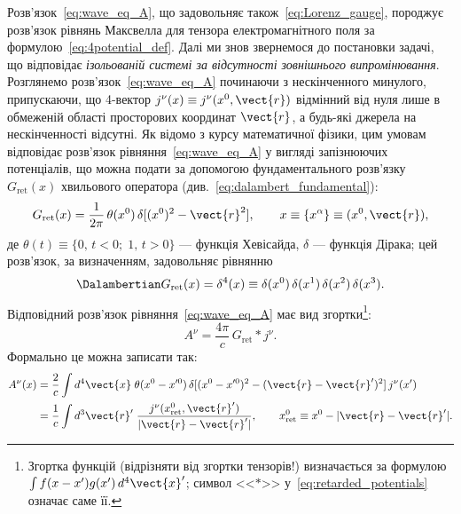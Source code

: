Розв'язок~\eqref{eq:wave_eq_A}, що задовольняє також~\eqref{eq:Lorenz_gauge}, породжує розв'язок рівнянь Максвелла для
тензора електромагнітного поля за формулою~\eqref{eq:4potential_def}. Далі ми знов звернемося до постановки задачі, що
відповідає \emph{ізольованій системі за відсутності зовнішнього випромінювання}. Розглянемо
розв'язок~\eqref{eq:wave_eq_A} починаючи з нескінченного минулого, припускаючи, що 4-вектор $j^{\nu}(x)\equiv
    j^{\nu}(x^0,\vect{r})$ відмінний від нуля лише в обмеженій області просторових координат $\vect{r}$, а будь-які джерела
на нескінченності відсутні. Як відомо з курсу математичної фізики, цим умовам відповідає розв'язок
рівняння~\eqref{eq:wave_eq_A} у вигляді запізнюючих потенціалів, що можна подати за допомогою фундаментального розв'язку
$G_\text{ret}(x)$ хвильового оператора (див.~\ref{eq:dalambert_fundamental}):
\begin{equation*}
    G_{\text{ret}}(x) = \frac{1}{2\pi}\,\theta(x^0)\,\delta[(x^0)^2 - \vect{r}^2],
    \qquad x\equiv\{x^{\alpha}\}\equiv(x^0,\vect{r}),
\end{equation*}
де $\theta(t)\equiv\{0,\,t<0;\;1,\,t>0\}$ --- функція Хевісайда, $\delta$ --- функція Дірака; цей розв'язок, за
визначенням, задовольняє рівнянню
\begin{equation*}
    \Dalambertian G_{\text{ret}}(x) = \delta^4(x)
    \equiv \delta(x^0)\,\delta(x^1)\,\delta(x^2)\,\delta(x^3).
\end{equation*}
Відповідний розв'язок рівняння~\eqref{eq:wave_eq_A} має вид згортки\footnote{Згортка функцій (відрізняти від згортки
    тензорів!) визначається за формулою $\int f(x-x')g(x')\,d^4\vect{x}'$; символ <<$*$>> у~\eqref{eq:retarded_potentials}
    означає саме її.}:
\begin{equation}\label{eq:retarded_potentials}
    A^{\nu} = \frac{4\pi}{c}\,G_{\text{ret}}*j^{\nu}.
\end{equation}
Формально це можна записати так:
\begin{align*}
    A^{\nu}(x) & = \frac{2}{c}\int d^4\vect{x}\;
    \theta(x^0-x'^0)\,\delta[(x^0-x'^0)^2 - (\vect{r}-\vect{r}')^2]\,
    j^{\nu}(x')                                   \\
               & = \frac{1}{c}\int d^3\vect{r}'\;
    \frac{j^{\nu}(x_{\text{ret}}^0,\vect{r}')}{|\vect{r}-\vect{r}'|},
    \qquad x_{\text{ret}}^0 \equiv x^0 - |\vect{r}-\vect{r}'|.
\end{align*}

